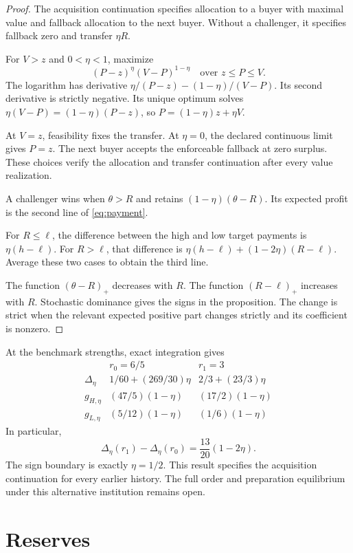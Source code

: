 \documentclass[12pt]{article}
\begin{document}
\begin{proof}
The acquisition continuation specifies allocation to a buyer with maximal value and fallback allocation to the next buyer.
Without a challenger, it specifies fallback zero and transfer $\eta R$.

For $V>z$ and $0<\eta<1$, maximize
\[
 (P-z)^\eta(V-P)^{1-\eta}\quad\text{over }z\le P\le V.
\]
The logarithm has derivative $\eta/(P-z)-(1-\eta)/(V-P)$.
Its second derivative is strictly negative.
Its unique optimum solves $\eta(V-P)=(1-\eta)(P-z)$, so $P=(1-\eta)z+\eta V$.

At $V=z$, feasibility fixes the transfer.
At $\eta=0$, the declared continuous limit gives $P=z$.
The next buyer accepts the enforceable fallback at zero surplus.
These choices verify the allocation and transfer continuation after every value realization.

A challenger wins when $\theta>R$ and retains $(1-\eta)(\theta-R)$.
Its expected profit is the second line of \eqref{eq:payment}.

For $R\le\ell$, the difference between the high and low target payments is $\eta(h-\ell)$.
For $R>\ell$, that difference is $\eta(h-\ell)+(1-2\eta)(R-\ell)$.
Average these two cases to obtain the third line.

The function $(\theta-R)_+$ decreases with $R$.
The function $(R-\ell)_+$ increases with $R$.
Stochastic dominance gives the signs in the proposition.
The change is strict when the relevant expected positive part changes strictly and its coefficient is nonzero.
\end{proof}

At the benchmark strengths, exact integration gives
\[
\begin{array}{c|cc}
 &r_0=6/5&r_1=3\\\hline
 \Delta_\eta&1/60+(269/30)\eta&2/3+(23/3)\eta\\
 g_{H,\eta}&(47/5)(1-\eta)&(17/2)(1-\eta)\\
 g_{L,\eta}&(5/12)(1-\eta)&(1/6)(1-\eta)
\end{array}
\]
In particular,
\[
 \Delta_\eta(r_1)-\Delta_\eta(r_0)=\frac{13}{20}(1-2\eta).
\]
The sign boundary is exactly $\eta=1/2$.
This result specifies the acquisition continuation for every earlier history.
The full order and preparation equilibrium under this alternative institution remains open.

\section{Reserves}\label{sec:reserves}
\end{document}
